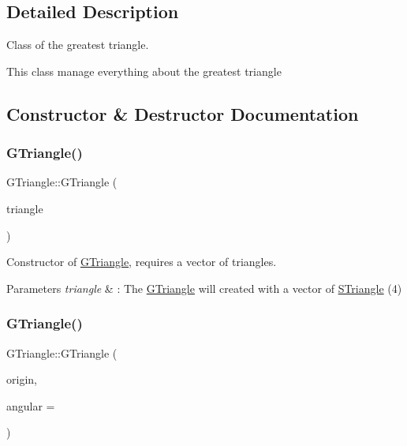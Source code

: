 \subsection{Detailed Description}
Class of the greatest triangle. 

This class manage everything about the greatest triangle 

\subsection{Constructor \& Destructor Documentation}
\mbox{\label{classGTriangle_a969f76093f398cda98268aba05d57336}} 
\subsubsection{\texorpdfstring{G\+Triangle()}{GTriangle()}\hspace{0.1cm}{\footnotesize\ttfamily [1/2]}}
{\footnotesize\ttfamily G\+Triangle\+::\+G\+Triangle (\begin{DoxyParamCaption}\item[{const std\+::vector$<$ \hyperlink{classSTriangle}{S\+Triangle} $>$ \&}]{triangle }\end{DoxyParamCaption})\hspace{0.3cm}{\ttfamily [explicit]}}



Constructor of \hyperlink{classGTriangle}{G\+Triangle}, requires a vector of triangles. 


\begin{DoxyParams}{Parameters}
{\em triangle} & \+: The \hyperlink{classGTriangle}{G\+Triangle} will created with a vector of \hyperlink{classSTriangle}{S\+Triangle} (4) \\
\hline
\end{DoxyParams}
\mbox{\label{classGTriangle_ae5a721f4da22b1c25d9305307d923a3e}} 
\subsubsection{\texorpdfstring{G\+Triangle()}{GTriangle()}\hspace{0.1cm}{\footnotesize\ttfamily [2/2]}}
{\footnotesize\ttfamily G\+Triangle\+::\+G\+Triangle (\begin{DoxyParamCaption}\item[{\hyperlink{classPoint}{Point}$<$ double $>$}]{origin,  }\item[{double}]{angular = {} }\end{DoxyParamCaption})\hspace{0.3cm}{\ttfamily [explicit]}}



